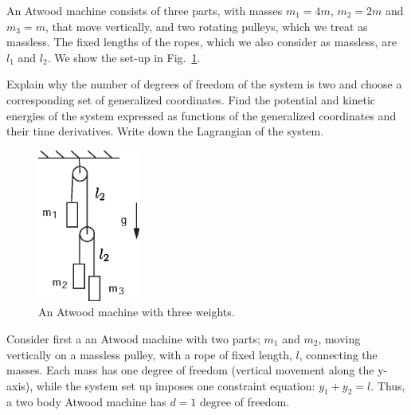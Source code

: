 \documentclass[11pt,a4paper]{report}
\newcounter{excount}[chapter]
\newenvironment{exercise}[1][]{\addtocounter{excount}{1} \noindent {\bf Problem
    \arabic{excount} \ \ #1}\hspace{2mm}}{\vspace{4mm}}
\begin{document}




\begin{exercise}
An Atwood machine consists of three parts, with masses $m_1=4m$, $m_2=2m$ and $m_3=m$, that move vertically, and two rotating pulleys, which we treat as massless.  The fixed lengths of the ropes, which we also consider as massless, are $l_1$ and $l_2$. We show the set-up in Fig.~\ref{fig:atwood}.

Explain why the number of degrees of freedom of the system is two and choose a corresponding set of generalized coordinates. Find the potential and kinetic energies of the system expressed as functions of the generalized coordinates and their time derivatives. Write down the Lagrangian of the system.

\begin{figure}[h!]
\begin{center}
\includegraphics[height=5cm]{Atwood.eps}
\end{center}
\caption{An Atwood machine with three weights.}
\label{fig:atwood}
\end{figure}

Consider first a an Atwood machine with two parts; $m_1$ and $m_2$, moving vertically on a massless pulley, with a rope of fixed length, $l$, connecting the masses. Each mass has one degree of freedom (vertical movement along the y-axis), while the system set up imposes one constraint equation: $y_1+y_2=l$. Thus, a two body Atwood machine has $d=1$ degree of freedom. \par 


\end{exercise}
\end{document}

